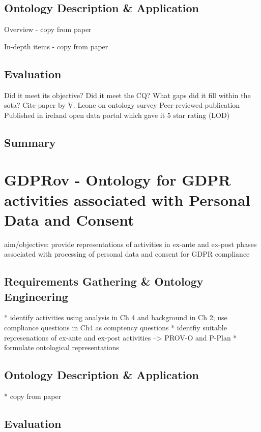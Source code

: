 \subsection{Ontology Description \& Application}
Overview - copy from paper

In-depth items - copy from paper

\subsection{Evaluation}
Did it meet its objective?
Did it meet the CQ?
What gaps did it fill within the sota? Cite paper by V. Leone on ontology survey
Peer-reviewed publication
Published in ireland open data portal which gave it 5 star rating (LOD)

\subsection*{Summary}

\section{GDPRov - Ontology for GDPR activities associated with Personal Data and Consent}\label{sec:voc:GDPRov}

aim/objective: provide representations of activities in ex-ante and ex-post phases associated with processing of personal data and consent for GDPR compliance

\subsection{Requirements Gathering \& Ontology Engineering}

* identify activities using analysis in Ch 4 and  background in Ch 2; use compliance questions in Ch4 as comptency questions
* identfiy suitable represenations of ex-ante and ex-post activities --> PROV-O and P-Plan
* formulate ontological representations

\subsection{Ontology Description \& Application}

* copy from paper

\subsection{Evaluation}

